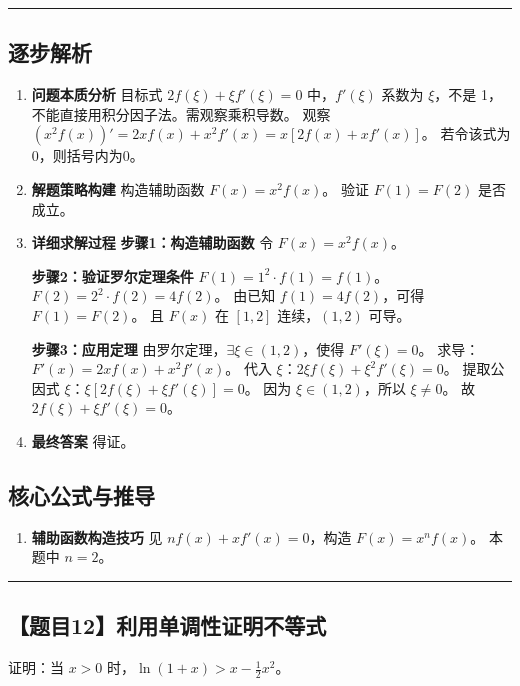 \documentclass[UTF8]{ctexart}
\newenvironment{redenv}{\color{red}}{}
\newenvironment{detailedanalysis}{%
    \color{red}
    \begin{enumerate}[label=\textbf{第\arabic*步：}, leftmargin=*, align=left, itemsep=1.5ex]
}{%
    \end{enumerate}
}
\newenvironment{formuladerivation}{%
    \begin{enumerate}[label={\textbf{公式\arabic*：}}, leftmargin=*, align=left]
}{%
    \end{enumerate}
}
\newcommand{\problemrule}{\noindent\rule{\textwidth}{1.5pt}\vspace{-0.8em}}
\newcommand{\analysisrule}{\noindent\rule{\textwidth}{0.8pt}\vspace{-0.8em}}
\begin{document}
\begin{redenv}
\analysisrule
\subsection*{逐步解析}

\begin{detailedanalysis}
\item \textbf{问题本质分析}
目标式 $2f(\xi) + \xi f'(\xi) = 0$ 中，$f'(\xi)$ 系数为 $\xi$，不是 1，不能直接用积分因子法。需观察乘积导数。
观察 $(x^2 f(x))' = 2x f(x) + x^2 f'(x) = x[2f(x) + xf'(x)]$。
若令该式为0，则括号内为0。

\item \textbf{解题策略构建}
构造辅助函数 $F(x) = x^2 f(x)$。
验证 $F(1) = F(2)$ 是否成立。

\item \textbf{详细求解过程}
\noindent\textbf{步骤1：构造辅助函数}
令 $F(x) = x^2 f(x)$。

\noindent\textbf{步骤2：验证罗尔定理条件}
$F(1) = 1^2 \cdot f(1) = f(1)$。
$F(2) = 2^2 \cdot f(2) = 4f(2)$。
由已知 $f(1) = 4f(2)$，可得 $F(1) = F(2)$。
且 $F(x)$ 在 $[1, 2]$ 连续，$(1, 2)$ 可导。

\noindent\textbf{步骤3：应用定理}
由罗尔定理，$\exists \xi \in (1, 2)$，使得 $F'(\xi) = 0$。
求导：$F'(x) = 2x f(x) + x^2 f'(x)$。
代入 $\xi$：$2\xi f(\xi) + \xi^2 f'(\xi) = 0$。
提取公因式 $\xi$：$\xi [2f(\xi) + \xi f'(\xi)] = 0$。
因为 $\xi \in (1, 2)$，所以 $\xi \neq 0$。
故 $2f(\xi) + \xi f'(\xi) = 0$。

\item \textbf{最终答案}
得证。
\end{detailedanalysis}

\subsection*{核心公式与推导}
\begin{formuladerivation}
\item \textbf{辅助函数构造技巧}
见 $n f(x) + x f'(x) = 0$，构造 $F(x) = x^n f(x)$。
本题中 $n=2$。
\end{formuladerivation}
\end{redenv}

\vspace{2em}
\problemrule
\subsection*{【题目12】利用单调性证明不等式}
证明：当 $x > 0$ 时，$\ln(1+x) > x - \frac{1}{2}x^2$。
\end{document}
